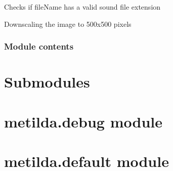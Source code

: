 \documentclass[letterpaper,10pt,english]{sphinxmanual}
\begin{document}
\begin{fulllineitems}
\label{\detokenize{metilda.services:metilda.services.utils.isSound}}
\pysigstartsignatures
{}
\pysigstopsignatures
\sphinxAtStartPar
Checks if fileName has a valid sound file extension

\end{fulllineitems}


\begin{fulllineitems}
\label{\detokenize{metilda.services:metilda.services.utils.resizeImage}}
\pysigstartsignatures
{}
\pysigstopsignatures
\sphinxAtStartPar
Down\sphinxhyphen{}scaling the image to 500x500 pixels

\end{fulllineitems}



\subsubsection{Module contents}
\label{\detokenize{metilda.services:module-metilda.services}}\label{\detokenize{metilda.services:module-contents}}

\section{Submodules}
\label{\detokenize{index:submodules}}

\section{metilda.debug module}
\label{\detokenize{index:module-metilda.debug}}\label{\detokenize{index:metilda-debug-module}}

\section{metilda.default module}
\label{\detokenize{index:module-metilda.default}}\label{\detokenize{index:metilda-default-module}}
\end{document}

